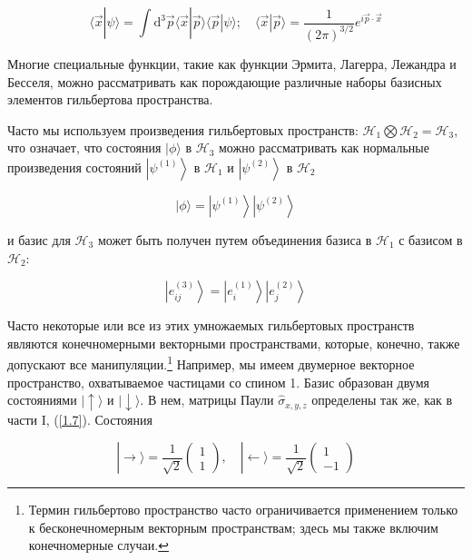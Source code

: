 \documentclass[main.tex]{subfiles}
\begin{document}
\begin{equation}\label{11.5}
	\langle\vec{x} | \psi\rangle=\int \mathrm{d}^{3} \vec{p}\langle\vec{x} | \vec{p}\rangle\langle\vec{p} | \psi\rangle ; \quad\langle\vec{x} | \vec{p}\rangle=\frac{1}{(2 \pi)^{3 / 2}} e^{i \vec{p} \cdot \vec{x}}
\end{equation}
                          
Многие специальные функции, такие как функции Эрмита, Лагерра, Лежандра и Бесселя, можно рассматривать как порождающие различные наборы базисных элементов гильбертова пространства.

Часто мы используем произведения гильбертовых пространств: $\mathcal{H}_1\bigotimes \mathcal{H}_2 = \mathcal{H}_3$, что означает, что состояния $\mid \phi\rangle$ в $\mathcal{H}_3$ можно рассматривать как нормальные произведения состояний $\left|\psi^{(1)}\right\rangle$ в $\mathcal{H}_1$ и $\left|\psi^{(2)}\right\rangle$ в $\mathcal{H}_2$

\begin{equation}\label{11.6}
	|\phi\rangle=\left|\psi^{(1)}\right\rangle\left|\psi^{(2)}\right\rangle
\end{equation}

и базис для $\mathcal{H}_3$ может быть получен путем объединения базиса в $\mathcal{H}_1$ с базисом в $\mathcal{H}_2$:
 
\begin{equation}\label{11.7}
	\left|e_{i j}^{(3)}\right\rangle=\left|e_{i}^{(1)}\right\rangle\left|e_{j}^{(2)}\right\rangle
\end{equation}

Часто некоторые или все из этих умножаемых гильбертовых пространств являются конечномерными векторными пространствами, которые, конечно, также допускают все манипуляции.\footnote{Термин гильбертово пространство часто ограничивается применением только к бесконечномерным векторным пространствам; здесь мы также включим конечномерные случаи.} Например, мы имеем двумерное векторное пространство, охватываемое частицами со спином 1. Базис образован двумя состояниями $\mid\uparrow\rangle$ и $\mid\downarrow\rangle$. В нем, матрицы Паули $\hat\sigma_{x,y,z}$ определены так же, как в части I, (\ref{1.7}). Состояния
 
\begin{equation}\label{11.8}
	|\rightarrow\rangle=\frac{1}{\sqrt{2}}\left(\begin{array}{l}{1} \\ {1}\end{array}\right), \quad|\leftarrow\rangle=\frac{1}{\sqrt{2}}\left(\begin{array}{c}{1} \\ {-1}\end{array}\right)
\end{equation}
 
\end{document}
